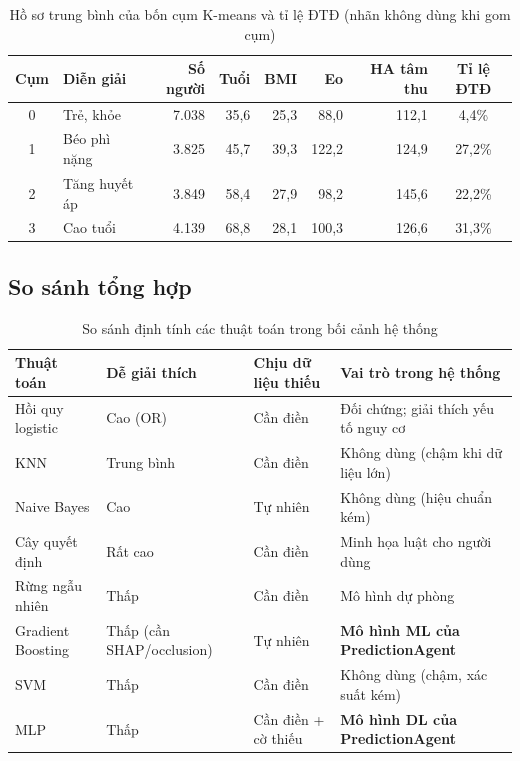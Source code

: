 \begin{table}[H]
\centering
\caption{Hồ sơ trung bình của bốn cụm K-means và tỉ lệ ĐTĐ (nhãn không dùng khi gom cụm)}
\label{tab:ch2-km}
\small
\begin{adjustbox}{max width=\linewidth}
\begin{tabular}{@{}clrrrrrc@{}}
\toprule
\textbf{Cụm} & \textbf{Diễn giải} & \textbf{Số người} & \textbf{Tuổi} & \textbf{BMI} & \textbf{Eo} & \textbf{HA tâm thu} & \textbf{Tỉ lệ ĐTĐ} \\
\midrule
0 & Trẻ, khỏe & 7.038 & 35,6 & 25,3 & 88,0 & 112,1 & 4,4\% \\
1 & Béo phì nặng & 3.825 & 45,7 & 39,3 & 122,2 & 124,9 & 27,2\% \\
2 & Tăng huyết áp & 3.849 & 58,4 & 27,9 & 98,2 & 145,6 & 22,2\% \\
3 & Cao tuổi & 4.139 & 68,8 & 28,1 & 100,3 & 126,6 & 31,3\% \\
\bottomrule
\end{tabular}
\end{adjustbox}
\end{table}

\subsection{So sánh tổng hợp}

\begin{table}[H]
\centering
\caption{So sánh định tính các thuật toán trong bối cảnh hệ thống}
\label{tab:ch2-compare}
\small
\begin{tabularx}{\linewidth}{@{}L{2.8cm}L{2.2cm}L{2.0cm}Y@{}}
\toprule
\textbf{Thuật toán} & \textbf{Dễ giải thích} & \textbf{Chịu dữ liệu thiếu} & \textbf{Vai trò trong hệ thống} \\
\midrule
Hồi quy logistic & Cao (OR) & Cần điền & Đối chứng; giải thích yếu tố nguy cơ \\
KNN & Trung bình & Cần điền & Không dùng (chậm khi dữ liệu lớn) \\
Naive Bayes & Cao & Tự nhiên & Không dùng (hiệu chuẩn kém) \\
Cây quyết định & Rất cao & Cần điền & Minh họa luật cho người dùng \\
Rừng ngẫu nhiên & Thấp & Cần điền & Mô hình dự phòng \\
Gradient Boosting & Thấp (cần SHAP/occlusion) & Tự nhiên & \textbf{Mô hình ML của PredictionAgent} \\
SVM & Thấp & Cần điền & Không dùng (chậm, xác suất kém) \\
MLP & Thấp & Cần điền + cờ thiếu & \textbf{Mô hình DL của PredictionAgent} \\
\bottomrule
\end{tabularx}
\end{table}

